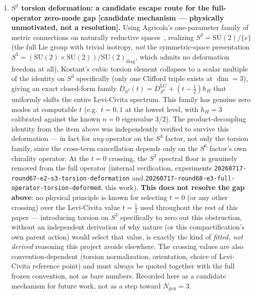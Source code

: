 \documentclass[12pt,a4paper]{article}
\begin{document}
\begin{enumerate}
\item \textbf{$S^3$ torsion deformation: a candidate escape route for the
  full-operator zero-mode gap [candidate mechanism --- physically unmotivated,
  not a resolution].} Using Agricola's one-parameter family of metric connections
  on naturally reductive spaces~\cite{Agricola2002}, realizing $S^3=\mathrm{SU}(2)/\{e\}$
  (the full Lie group with trivial isotropy, \emph{not} the symmetric-space
  presentation $S^3=(\mathrm{SU}(2)\times\mathrm{SU}(2))/\mathrm{SU}(2)_{\mathrm{diag}}$,
  which admits no deformation freedom at all), Kostant's cubic torsion element
  collapses to a scalar multiple of the identity on $S^3$ specifically (only one
  Clifford triple exists at $\dim=3$), giving an exact closed-form family
  $D_{S^3}(t) = D_{S^3}^{\mathrm{LC}} + (t-\tfrac12)h_H$ that uniformly shifts the
  entire Levi-Civita spectrum. This family has genuine zero modes at computable
  $t$ (e.g.\ $t=0,1$ at the lowest level, with $h_H=3$ calibrated against the
  known $n=0$ eigenvalue $3/2$). The product-decoupling identity from the item
  above was independently verified to survive this deformation --- in fact for
  \emph{any} operator on the $S^3$ factor, not only the torsion family, since
  the cross-term cancellation depends only on the $S^6$ factor's own chirality
  operator. At the $t=0$ crossing, the $S^3$ spectral floor is genuinely removed
  from the full operator (internal verification, experiments
  \texttt{20260717-round67-e2-s3-torsion-deformation} and
  \texttt{20260717-round68-e3-full-operator-torsion-deformed}, this work).
  \textbf{This does not resolve the gap above}: no physical principle is known
  for selecting $t=0$ (or any other crossing) over the Levi-Civita value
  $t=\tfrac12$ used throughout the rest of this paper --- introducing torsion
  on $S^3$ specifically to zero out this obstruction, without an independent
  derivation of why nature (or this compactification's own parent action)
  would select that value, is exactly the kind of \emph{fitted, not derived}
  reasoning this project avoids elsewhere. The crossing values are also
  convention-dependent (torsion normalization, orientation, choice of
  Levi-Civita reference point) and must always be quoted together with the
  full frozen convention, not as bare numbers. Recorded here as a candidate
  mechanism for future work, not as a step toward $N_{\mathrm{gen}}=3$.


\end{enumerate}
\end{document}
